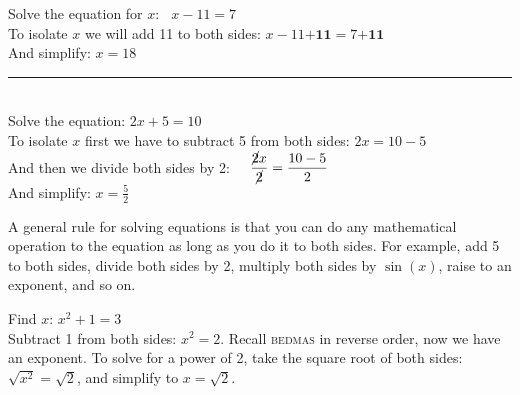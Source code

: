 \example Solve the equation for $x$: $\phantom{a}x-11=7$\medskip\\
\solution To isolate $x$ we will add 11 to both sides: $x-11\textbf{+11}=7\textbf{+11}$\\
And simplify: $x=18$\\
\rule{6.8cm}{0.5pt}\\
\example Solve the equation: $2x+5=10$\medskip\\
\solution To isolate $x$ first we have to subtract 5 from both sides: $2x=10-5$\\
And then we divide both sides by 2: $\displaystyle\phantom{aa}\frac{\cancel{2}x}{\cancel{2}}=\frac{10-5}{2}$\\
And simplify: $\displaystyle x=\frac{5}{2}$

\begin{tcolorbox}
A general rule for solving equations is that you can do any mathematical operation to the equation as long as you do it to both sides. For example, add 5 to both sides, divide both sides by 2, multiply both sides by $\sin(x)$, raise to an exponent, and so on.
\end{tcolorbox}
\example Find $x$: $x^2+1=3$\medskip\\
\solution Subtract 1 from both sides: $x^2=2$. Recall \textsc{bedmas} in reverse order, now we have an exponent. To solve for a power of 2, take the square root of both sides: $\sqrt{x^2}=\sqrt{2}$, and simplify to $x=\sqrt{2}$.
